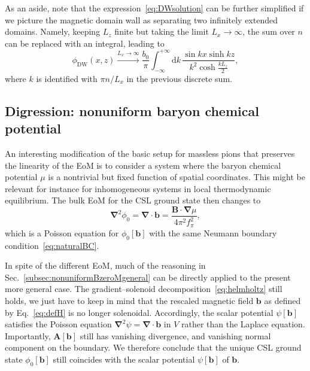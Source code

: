 \documentclass[pdflatex,iicol,sn-mathphys-num]{sn-jnl}
\let\m=\mu
\let\p=\phi
\newcommand{\dd}{\text{d}}%
\newcommand{\vek}[1]{\bm{#1}}%
\newcommand{\grad}{\vek\nabla}%
\newcommand{\divg}{\grad\cdot}%
\newcommand{\bmag}{b}%
\begin{document}
As an aside, note that the expression~\eqref{eq:DWsolution} can be further simplified if we picture the magnetic domain wall as separating two infinitely extended domains. Namely, keeping $L_z$ finite but taking the limit $L_x\to\infty$, the sum over $n$ can be replaced with an integral, leading to
\begin{equation}
\p_{\text{DW}}(x,z)\xrightarrow{L_x\to\infty}\frac{\bmag_0}{\pi}\int_{-\infty}^{+\infty}\dd k\,\frac{\sin kx\sinh kz}{k^2\cosh\frac{kL_z}2},
\end{equation}
where $k$ is identified with $\pi n/L_x$ in the previous discrete sum.


\subsection{Digression: nonuniform baryon chemical potential}
\label{subsec:nonuniformBzeroMdigression}

An interesting modification of the basic setup for massless pions that preserves the linearity of the EoM is to consider a system where the baryon chemical potential $\m$ is a nontrivial but fixed function of spatial coordinates. This might be relevant for instance for inhomogeneous systems in local thermodynamic equilibrium. The bulk EoM for the CSL ground state then changes to
\begin{equation}
\grad^2\p_0=\divg\vek\bmag=\frac{\vek B\cdot\grad\m}{4\pi^2f_\pi^2},
\end{equation}
which is a Poisson equation for $\p_0[\vek\bmag]$ with the same Neumann boundary condition~\eqref{eq:naturalBC}.

In spite of the different EoM, much of the reasoning in Sec.~\ref{subsec:nonuniformBzeroMgeneral} can be directly applied to the present more general case. The gradient--solenoid decomposition~\eqref{eq:helmholtz} still holds, we just have to keep in mind that the rescaled magnetic field $\vek\bmag$ as defined by Eq.~\eqref{eq:defH} is no longer solenoidal. Accordingly, the scalar potential $\psi[\vek\bmag]$ satisfies the Poisson equation $\grad^2\psi=\divg\vek\bmag$ in $V$ rather than the Laplace equation. Importantly, $\vek A[\vek\bmag]$ still has vanishing divergence, and vanishing normal component on the boundary. We therefore conclude that the unique CSL ground state $\p_0[\vek\bmag]$  still coincides with the scalar potential $\psi[\vek\bmag]$ of $\vek\bmag$.
\end{document}
